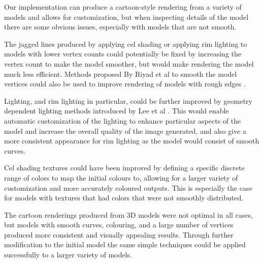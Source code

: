 Our implementation can produce a cartoon-style rendering from a variety of models and allows for customization, but when inspecting details of the model there are some obvious issues, especially with models that are not smooth.

The jagged lines produced by applying cel shading or applying rim lighting to models with lower vertex counts could potentially be fixed by increasing the vertex count to make the model smoother, but would make rendering the model much less efficient. Methods proposed By Riyad et al to smooth the model vertices could also be used to improve rendering of models with rough edges \cite{riyad16}. 

Lighting, and rim lighting in particular, could be further improved by geometry dependent lighting methods introduced by Lee et al \cite{lee06}. This would enable automatic customization of the lighting to enhance particular aspects of the model and increase the overall quality of the image generated, and also give a more consistent appearance for rim lighting as the model would consist of smooth curves.

Cel shading textures could have been improved by defining a specific discrete range of colors to map the initial colours to, allowing for a larger variety of customization and more accurately coloured outputs. This is especially the case for models with textures that had colors that were not smoothly distributed.

The cartoon renderings produced from 3D models were not optimal in all cases, but models with smooth curves, colouring, and a large number of vertices produced more consistent and visually appealing results. Through further modification to the initial model the same simple techniques could be applied successfully to a larger variety of models.